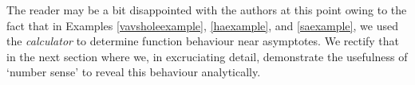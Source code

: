 \medskip

The reader may be a bit disappointed with the authors at this point owing to the fact that in Examples \ref{vavsholeexample}, \ref{haexample}, and \ref{saexample}, we used the \textit{calculator} to determine function behaviour near asymptotes.  We rectify that in the next section where we, in excruciating detail, demonstrate the usefulness of `number sense' to reveal this behaviour analytically.  


